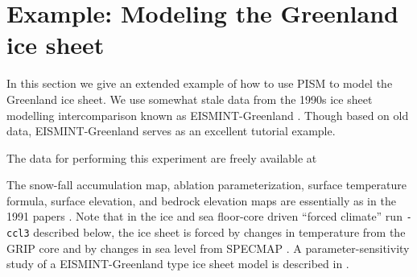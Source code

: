 \documentclass[11pt,final]{amsart}
\begin{document}

\clearpage\newpage
\section{Example: Modeling the Greenland ice sheet}\label{sect:green}  In this section we give an extended example of how to use PISM to model the Greenland ice sheet.  We use somewhat stale data from the 1990s ice sheet modelling intercomparison known as EISMINT-Greenland \cite{HuybrechtsEISMINT,RitzEISMINT}.  Though based on old data, EISMINT-Greenland serves as an excellent tutorial example.

The data for performing this experiment are freely available at
\medskip

\centerline{}
\medskip

\noindent The snow-fall accumulation map, ablation parameterization, surface temperature formula, surface elevation, and bedrock elevation maps are essentially as in the 1991 papers \cite{Letreguillyetal1991,OhmuraReeh}.  Note that in the ice and sea floor-core driven ``forced climate'' run \verb|-ccl3| described below, the ice sheet is forced by changes in temperature from the GRIP core \cite{Dansgaardetal1993} and by changes in sea level from SPECMAP \cite{Imbrieetal1984}.  A parameter-sensitivity study of a EISMINT-Greenland type ice sheet model is described in \cite{RitzFabreLetreguilly}.
\end{document}
